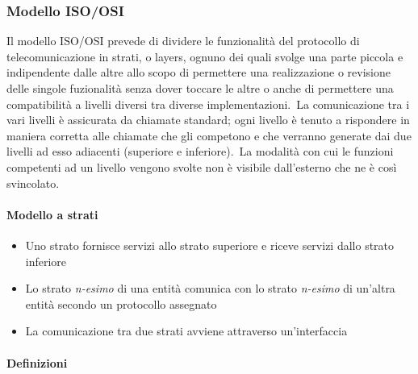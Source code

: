 \subsubsection{Modello ISO/OSI}

Il modello ISO/OSI prevede di dividere le funzionalità del protocollo di telecomunicazione in strati, o layers, ognuno dei quali svolge una parte piccola e indipendente dalle altre allo scopo di permettere una realizzazione o revisione delle singole fuzionalità senza dover toccare le altre o anche di permettere una compatibilità a livelli diversi tra diverse implementazioni.\
La comunicazione tra i vari livelli è assicurata da chiamate standard; ogni livello è tenuto a rispondere in maniera corretta alle chiamate che gli competono e che verranno generate dai due livelli ad esso adiacenti (superiore e inferiore).\
La modalità con cui le funzioni competenti ad un livello vengono svolte non è visibile dall'esterno che ne è così svincolato.

\paragraph{Modello a strati}

\begin{itemize}
    \item Uno strato fornisce servizi allo strato superiore e riceve servizi dallo strato inferiore
    \item Lo strato \emph{n-esimo} di una entità comunica con lo strato \emph{n-esimo} di un'altra entità secondo un protocollo assegnato
    \item La comunicazione tra due strati avviene attraverso un'interfaccia
\end{itemize}

\paragraph{Definizioni}

